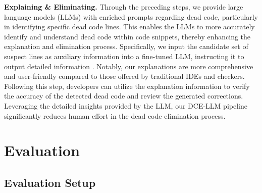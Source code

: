 \documentclass[11pt]{article}
\begin{document}
\textbf{Explaining \& Eliminating.}
Through the preceding steps, we provide large language models (LLMs) with enriched prompts regarding dead code, particularly in identifying specific dead code lines. This enables the LLMs to more accurately identify and understand dead code within code snippets, thereby enhancing the explanation and elimination process. Specifically, we input the candidate set of suspect lines as auxiliary information into a fine-tuned LLM, instructing it to output detailed information . Notably, our explanations are more comprehensive and user-friendly compared to those offered by traditional IDEs and checkers. Following this step, developers can utilize the explanation information to verify the accuracy of the detected dead code and review the generated corrections. Leveraging the detailed insights provided by the LLM, our DCE-LLM pipeline significantly reduces human effort in the dead code elimination process.


\section{Evaluation}





\subsection{Evaluation Setup}
\end{document}
